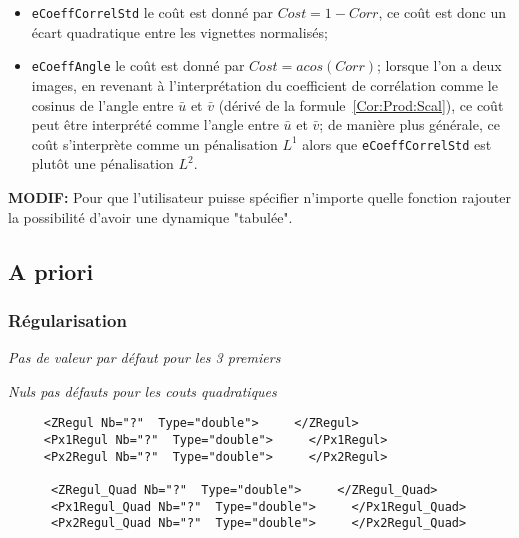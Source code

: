 \begin{itemize}
   \item {\tt eCoeffCorrelStd} le co\^ut est  donn\'e par
         $Cost=1-Corr$, ce co\^ut est donc un \'ecart quadratique
         entre les vignettes normalis\'es;


   \item {\tt eCoeffAngle} le co\^ut est  donn\'e par
         $Cost=acos(Corr)$; lorsque l'on a deux images,
         en revenant \`a l'interpr\'etation du coefficient
         de corr\'elation comme le cosinus de l'angle entre
         $\bar{u}$ et $\bar{v}$ (d\'eriv\'e de la formule~\ref{Cor:Prod:Scal}),
         ce co\^ut peut \^etre interpr\'et\'e comme l'angle entre
          $\bar{u}$ et $\bar{v}$; de mani\`ere plus g\'en\'erale,
         ce co\^ut s'interpr\`ete comme un p\'enalisation $L^1$
         alors que {\tt eCoeffCorrelStd} est plut\^ot une p\'enalisation
         $L^2$.

\end{itemize}

{\bf MODIF:}  Pour que l'utilisateur puisse sp\'ecifier n'importe
quelle fonction rajouter la possibilit\'e d'avoir une dynamique "tabul\'ee".

\subsection{A priori}

\subsubsection{R\'egularisation}

\emph{Pas de valeur par d\'efaut pour les 3 premiers}

\emph{Nuls pas d\'efauts pour les couts quadratiques}

\begin{verbatim}
     <ZRegul Nb="?"  Type="double">     </ZRegul>
     <Px1Regul Nb="?"  Type="double">     </Px1Regul>
     <Px2Regul Nb="?"  Type="double">     </Px2Regul>

      <ZRegul_Quad Nb="?"  Type="double">     </ZRegul_Quad>
      <Px1Regul_Quad Nb="?"  Type="double">     </Px1Regul_Quad>
      <Px2Regul_Quad Nb="?"  Type="double">     </Px2Regul_Quad>


\end{verbatim}


